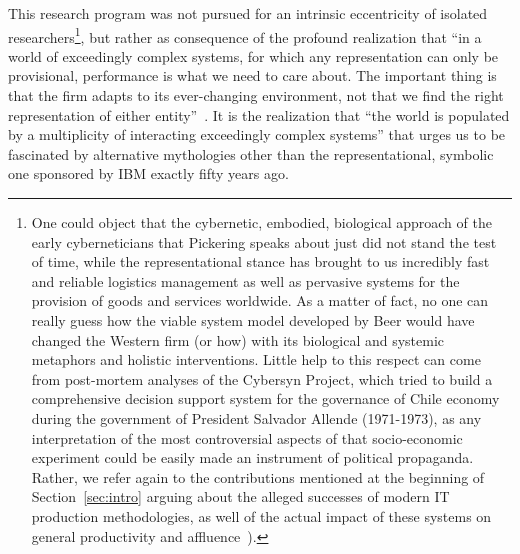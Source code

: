 \documentclass{article}
\begin{document}
This research program was not pursued for an intrinsic eccentricity of isolated researchers\footnote{One could object that the cybernetic, embodied, biological approach of the early cyberneticians that Pickering speaks about just did not stand the test of time, while the representational stance has brought to us incredibly fast and reliable logistics management as well as pervasive systems for the provision of goods and services worldwide. As a matter of fact, no one can really guess how the viable system model developed by Beer would have changed the Western firm (or how) with its biological and systemic metaphors and holistic interventions. Little help to this respect can come from post-mortem analyses of the Cybersyn Project, which tried to build a comprehensive decision support system for the governance of Chile economy during the government of President Salvador Allende (1971-1973), as any interpretation of the most controversial aspects of that socio-economic experiment could be easily made an instrument of political propaganda. Rather, we refer again to the contributions mentioned at the beginning of Section~\ref{sec:intro} arguing about the alleged successes of modern IT production methodologies, as well of the actual impact of these systems on general productivity and affluence~\citep[see also][]{carr_does_2004}).}, but rather as consequence of the profound realization that ``in a world of exceedingly complex systems, for which any representation can only be provisional, performance is what we need to care about. The important thing is that the firm adapts to its ever-changing environment, not that we find the right representation of either entity''~\citep[p. 235]{pickering_cybernetic_2010}. It is the realization that ``the world is populated by a multiplicity of interacting exceedingly complex systems'' that urges us to be fascinated by alternative mythologies other than the representational, symbolic one sponsored by IBM exactly fifty years ago.
\end{document}
